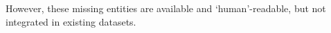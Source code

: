 \documentclass{ou-report}
\newcommand{\todo}[1]{{\color{red} TODO: #1}}
\newcommand{\vraag}[1]{{\color{teal} {\textbf{VRAGEN AAN HUGO: }}#1}}
\newcommand{\outline}[1]{{\color{blue} #1}}
\begin{document}
However, these missing entities are available and `human'-readable, but not 
integrated in existing datasets.










\end{document}
